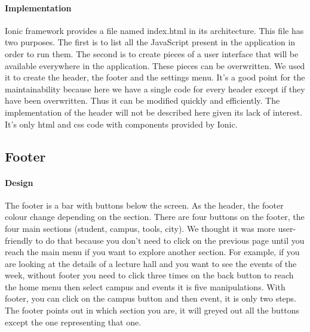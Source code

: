 \documentclass{eplmastersthesis}
\begin{document}
\paragraph{Implementation}
Ionic framework provides a file named index.html in its architecture. This file has two purposes. The first is to list all the JavaScript present in the application in order to run them. The second is to create pieces of a user interface that will be available everywhere in the application. These pieces can be overwritten. We used it to create the header, the footer and the settings menu. It's a good point for the maintainability because here we have a single code for every header except if they have been overwritten. Thus it can be modified quickly and efficiently. The implementation of the header will not be described here given its lack of interest. It's only html and css code with components provided by Ionic.
\subsection{Footer}
\paragraph{Design}
The footer is a bar with buttons below the screen. As the header, the footer colour change depending on the section. There are four buttons on the footer, the four main sections (student, campus, tools, city). We thought it was more user-friendly to do that because you don't need to click on the previous page until you reach the main menu if you want to explore another section. For example, if you are looking at the details of a lecture hall and you want to see the events of the week, without footer you need to click three times on the back button to reach the home menu then select campus and events it is five manipulations. With footer, you can click on the campus button and then event, it is only two steps. The footer points out in which section you are, it will greyed out all the buttons except the one representing that one.
\end{document}

